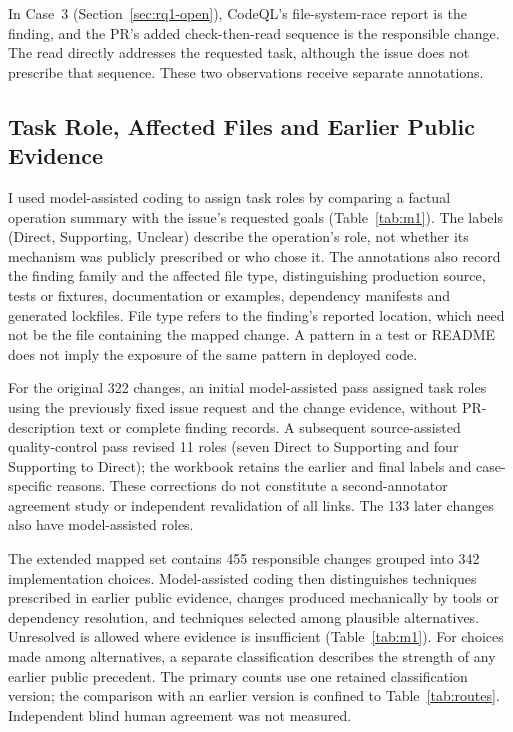 \documentclass[acmsmall,screen,nonacm]{acmart}
\begin{document}
In Case~3 (Section~\ref{sec:rq1-open}), CodeQL's file-system-race report is the finding, and the PR's added check-then-read sequence is the responsible change. The read directly addresses the requested task, although the issue does not prescribe that sequence. These two observations receive separate annotations.

\subsection{Task Role, Affected Files and Earlier Public Evidence}\label{sec:roles}

I used model-assisted coding to assign task roles by comparing a factual operation summary with the issue's requested goals (Table~\ref{tab:m1}). The labels (Direct, Supporting, Unclear) describe the operation's role, not whether its mechanism was publicly prescribed or who chose it. The annotations also record the finding family and the affected file type, distinguishing production source, tests or fixtures, documentation or examples, dependency manifests and generated lockfiles. File type refers to the finding's reported location, which need not be the file containing the mapped change. A pattern in a test or README does not imply the exposure of the same pattern in deployed code.

For the original 322 changes, an initial model-assisted pass assigned task roles using the previously fixed issue request and the change evidence, without PR-description text or complete finding records. A subsequent source-assisted quality-control pass revised 11 roles (seven Direct to Supporting and four Supporting to Direct); the workbook retains the earlier and final labels and case-specific reasons. These corrections do not constitute a second-annotator agreement study or independent revalidation of all links. The 133 later changes also have model-assisted roles.

The extended mapped set contains 455 responsible changes grouped into 342 implementation choices. Model-assisted coding then distinguishes techniques prescribed in earlier public evidence, changes produced mechanically by tools or dependency resolution, and techniques selected among plausible alternatives. Unresolved is allowed where evidence is insufficient (Table~\ref{tab:m1}). For choices made among alternatives, a separate classification describes the strength of any earlier public precedent. The primary counts use one retained classification version; the comparison with an earlier version is confined to Table~\ref{tab:routes}. Independent blind human agreement was not measured.
\end{document}
